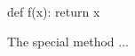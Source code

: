 \documentclass{article}
\begin{document}
\begin{python}
def f(x):
    return x
\end{python}
The special method ...
\end{document}
